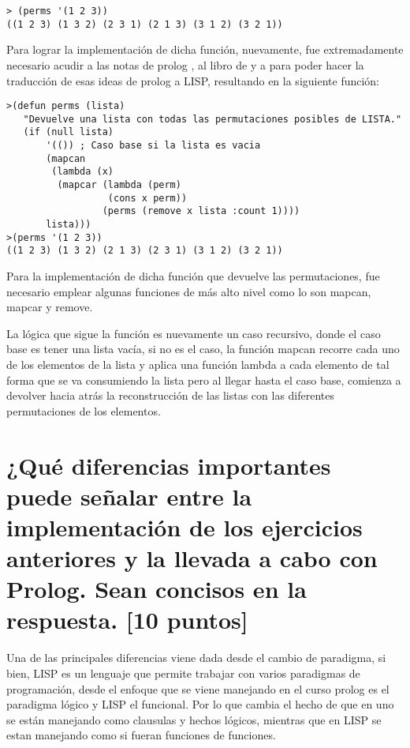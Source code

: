 \documentclass[11pt, letterpaper]{article}
\begin{document}
\begin{itemize}
	\begin{verbatim}
> (perms '(1 2 3))
((1 2 3) (1 3 2) (2 3 1) (2 1 3) (3 1 2) (3 2 1))
	\end{verbatim}
\end{itemize}

Para lograr la implementación de dicha función, nuevamente, fue extremadamente necesario acudir a las notas de prolog \cite{guerra2024}, al libro de \cite{clock2003} y a \cite{seibel2006} para poder hacer la traducción de esas ideas de prolog a LISP, resultando en la siguiente función:

\begin{itemize}
	\begin{verbatim}
>(defun perms (lista)
   "Devuelve una lista con todas las permutaciones posibles de LISTA."
   (if (null lista)
       '(()) ; Caso base si la lista es vacia
       (mapcan
        (lambda (x)
         (mapcar (lambda (perm)
                  (cons x perm))
                 (perms (remove x lista :count 1))))
       lista)))
>(perms '(1 2 3))
((1 2 3) (1 3 2) (2 1 3) (2 3 1) (3 1 2) (3 2 1))
	\end{verbatim}
\end{itemize}

Para la implementación de dicha función que devuelve las permutaciones, fue necesario emplear algunas funciones de más alto nivel como lo son mapcan, mapcar y remove.

La lógica que sigue la función es nuevamente un caso recursivo, donde el caso base es tener una lista vacía, si no es el caso, la función mapcan recorre cada uno de los elementos de la lista y aplica una función lambda a cada elemento de tal forma que se va consumiendo la lista pero al llegar hasta el caso base, comienza a devolver hacia atrás la reconstrucción de las listas con las diferentes permutaciones de los elementos.



\newpage

\section{¿Qué diferencias importantes puede señalar entre la implementación de los ejercicios anteriores y la llevada a cabo con Prolog. Sean concisos en la respuesta. [10 puntos]}

Una de las principales diferencias viene dada desde el cambio de paradigma, si bien, LISP es un lenguaje que permite trabajar con varios paradigmas de programación, desde el enfoque que se viene manejando en el curso prolog es el paradigma lógico y LISP el funcional. Por lo que cambia el hecho de que en uno se están manejando como clausulas y hechos lógicos, mientras que en LISP se estan  manejando como si fueran funciones de funciones.
\end{document}
